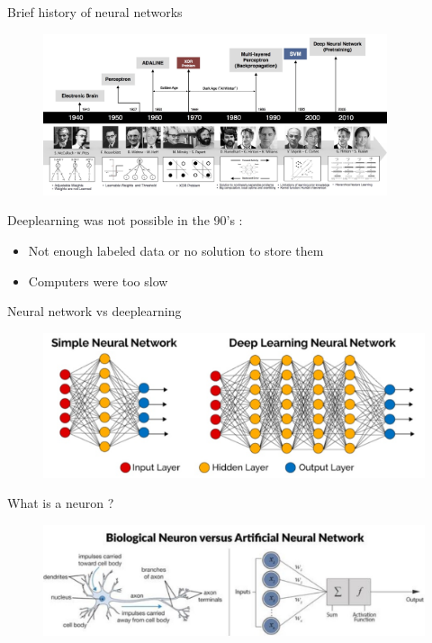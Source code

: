 \documentclass[tikz,table,border=2mm]{beamer}
\begin{document}
\begin{frame}{Brief history of neural networks}
\begin{figure}[ht]
    \centering
    \includegraphics[width=0.9\textwidth]{images/deeplearning_2.png}
\end{figure}
Deeplearning was not possible in the 90's :
\begin{itemize}
\item Not enough labeled data or no solution to store them
\item Computers were too slow
\end{itemize}
\end{frame}

\begin{frame}{Neural network vs deeplearning}
\begin{figure}[ht]
    \centering
    \includegraphics[width=\textwidth]{images/deeplearning_1.png}
\end{figure}
\end{frame}

\begin{frame}{What is a neuron ?}
\begin{figure}[ht]
    \centering
    \includegraphics[width=\textwidth]{images/deeplearning_3.png}
\end{figure}
\end{frame}
\end{document}
